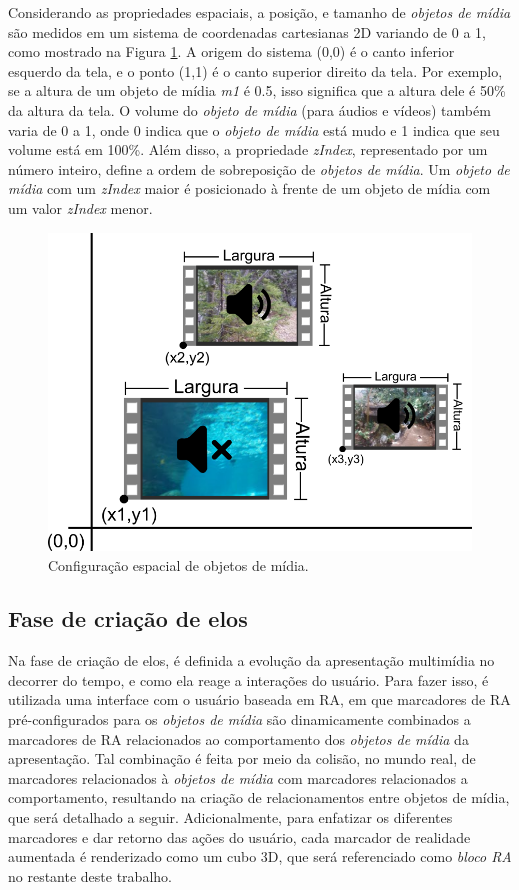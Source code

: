 \documentclass[../main.tex]{subfiles}
\begin{document}
Considerando as propriedades espaciais, a posição, e tamanho de \emph{objetos de mídia} são medidos em um sistema de coordenadas cartesianas 2D variando de 0 a 1, como mostrado na Figura \ref{fig:cartesiano}. A origem do sistema (0,0) é o canto inferior esquerdo da tela, e o ponto (1,1) é o canto superior direito da tela. Por exemplo, se a altura de um objeto de mídia \emph{m1} é 0.5, isso significa que a altura dele é 50\% da altura da tela.  O volume do \emph{objeto de mídia} (para áudios e vídeos) também varia de 0 a 1, onde 0 indica que o \emph{objeto de mídia} está mudo e 1 indica que seu volume está em 100\%. Além disso, a propriedade \emph{zIndex}, representado por um número inteiro, define a ordem de sobreposição de \emph{objetos de mídia}. Um \emph{objeto de mídia} com um \emph{zIndex} maior é posicionado à frente de um objeto de mídia com um valor \emph{zIndex} menor.

\begin{figure}[!h]
\centering
\includegraphics[width=0.7\linewidth]{IMG/media_config.png}
\caption{Configuração espacial de objetos de mídia.}
\label{fig:cartesiano}
\end{figure}

\subsection{Fase de criação de elos}
\label{subsec:criacao_elos}

Na fase de criação de elos, é definida a evolução da apresentação multimídia no decorrer do tempo, e como ela reage a interações do usuário. Para fazer isso, é utilizada uma interface com o usuário baseada em RA, em que marcadores de RA pré-configurados para os \emph{objetos de mídia} são dinamicamente combinados a marcadores de RA relacionados ao comportamento dos \emph{objetos de mídia} da apresentação. Tal combinação é feita por meio da colisão, no mundo real, de marcadores relacionados à \emph{objetos de mídia} com marcadores relacionados a comportamento, resultando na criação de relacionamentos entre objetos de mídia, que será detalhado a seguir. Adicionalmente, para enfatizar os diferentes marcadores e dar retorno das ações do usuário, cada marcador de realidade aumentada é renderizado como um cubo 3D, que será referenciado como \emph{bloco RA} no restante deste trabalho.
\end{document}
